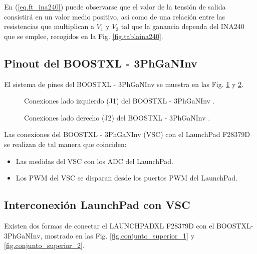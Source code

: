 \documentclass{report}
\begin{document}
En  (\ref{eq.ft_ina240}) puede observarse que el valor de la tensión de salida consistirá en un valor medio positivo, así como de una relación entre las resistencias que multiplican a $V_1$ y $V_2$ tal que la ganancia dependa del INA240 que se emplee, recogidos en la Fig. \ref{fig.tablaina240}.
\clearpage
\subsection{Pinout del BOOSTXL - 3PhGaNInv}

El sistema de pines del BOOSTXL - 3PhGaNInv se muestra en las Fig. \ref{fig.boostxlpinoutj1} y \ref{fig.boostxlpinoutj2}.

\begin{figure}[!h]
    \begin{center}
        \end{center}
        \caption{Conexiones lado izquierdo (J1) del BOOSTXL - 3PhGaNInv \cite{cincuentayuno}.}
        \label{fig.boostxlpinoutj1}
\end{figure}

\begin{figure}[!h]
    \begin{center}
        \end{center}
        \caption{Conexiones lado derecho (J2) del BOOSTXL - 3PhGaNInv \cite{cincuentayuno}.}
        \label{fig.boostxlpinoutj2}
\end{figure}


Las conexiones del BOOSTXL - 3PhGaNInv (VSC) con el LaunchPad F28379D se realizan de tal manera que coinciden:
\begin{itemize}
    \item Las medidas del VSC con los ADC del LaunchPad.
    \item Los PWM del VSC se disparan desde los puertos PWM del LaunchPad.
\end{itemize}

\clearpage
\subsection{Interconexión LaunchPad con VSC} \label{sec.conexionlaunchpadinversor}

Existen dos formas de conectar el LAUNCHPADXL F28379D con el BOOSTXL-3PhGaNInv, mostrado en las Fig. \ref{fig.conjunto_superior_1} y \ref{fig.conjunto_superior_2}.
\end{document}
